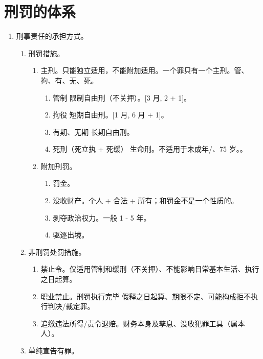 \section{刑罚的体系}
\begin{enumerate}
  \item 刑事责任的承担方式。
        \begin{enumerate}
          \item 刑罚措施。
                \begin{enumerate}
                  \item 主刑。只能独立适用，不能附加适用。一个罪只有一个主刑。管、拘、有、无、死。
                        \begin{enumerate}
                          \item 管制 \yjt 限制自由刑（不关押）。[3 月, 2 + 1]。
                          \item 拘役 \yjt 短期自由刑。[1 月, 6 月 + 1]。
                          \item 有期、无期 \yjt 长期自由刑。
                          \item 死刑（死立执 + 死缓） \yjt 生命刑。不适用于未成年/、75 岁。。
                        \end{enumerate}
                  \item 附加刑罚。
                        \begin{enumerate}
                          \item 罚金。
                          \item 没收财产。个人 + 合法 + 所有；和罚金不是一个性质的。
                          \item 剥夺政治权力。一般 1 - 5 年。
                          \item 驱逐出境。
                        \end{enumerate}
                \end{enumerate}
          \item 非刑罚处罚措施。
                \begin{enumerate}
                  \item 禁止令。仅适用管制和缓刑（不关押）、不能影响日常基本生活、执行之日起算。
                  \item 职业禁止。刑罚执行完毕 \hz 假释之日起算、期限不定、可能构成拒不执行判决/裁定罪。
                  \item 追缴违法所得/责令退赔。财务本身及孳息、没收犯罪工具（属本人）。
                \end{enumerate}
          \item 单纯宣告有罪。
        \end{enumerate}
\end{enumerate}
